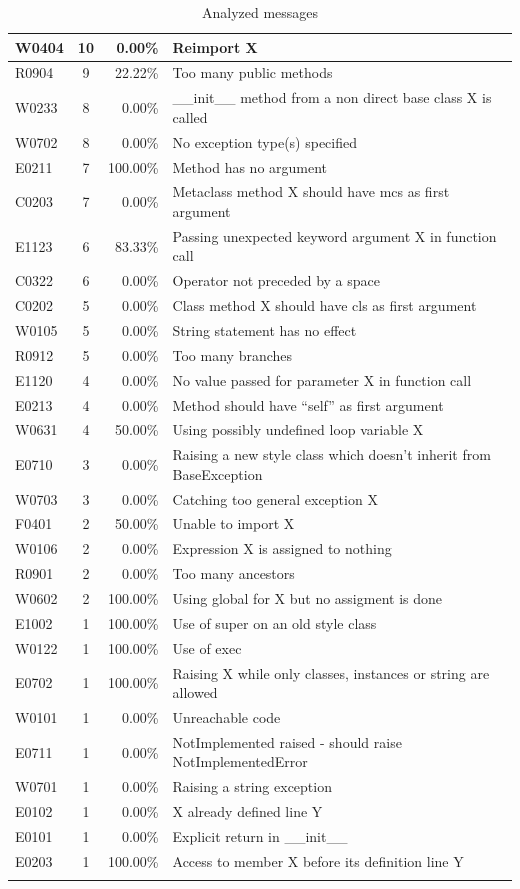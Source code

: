 \documentclass[11pt, a4paper]{article}
\begin{document}
\begin{longtable}{|l|c|r|m{9cm}|}
\hline
W0404 & 10 & 0.00\% & Reimport X \\
\hline
R0904 & 9 & 22.22\% & Too many public methods \\
\hline
W0233 & 8 & 0.00\% & \_\_init\_\_ method from a non direct base class X is called \\
\hline
W0702 & 8 & 0.00\% & No exception type(s) specified \\
\hline
E0211 & 7 & 100.00\% & Method has no argument \\
\hline
C0203 & 7 & 0.00\% & Metaclass method X should have mcs as first argument \\
\hline
E1123 & 6 & 83.33\% & Passing unexpected keyword argument X in function call \\
\hline
C0322 & 6 & 0.00\% & Operator not preceded by a space \\
\hline
C0202 & 5 & 0.00\% & Class method X should have cls as first argument \\
\hline
W0105 & 5 & 0.00\% & String statement has no effect \\
\hline
R0912 & 5 & 0.00\% & Too many branches \\
\hline
E1120 & 4 & 0.00\% & No value passed for parameter X in function call \\
\hline
E0213 & 4 & 0.00\% & Method should have \enquote{self} as first argument \\
\hline
W0631 & 4 & 50.00\% & Using possibly undefined loop variable X \\
\hline
E0710 & 3 & 0.00\% & Raising a new style class which doesn't inherit from BaseException \\
\hline
W0703 & 3 & 0.00\% & Catching too general exception X \\
\hline
F0401 & 2 & 50.00\% & Unable to import X \\
\hline
W0106 & 2 & 0.00\% & Expression X is assigned to nothing \\
\hline
R0901 & 2 & 0.00\% & Too many ancestors \\
\hline
W0602 & 2 & 100.00\% & Using global for X but no assigment is done \\
\hline
E1002 & 1 & 100.00\% & Use of super on an old style class \\
\hline
W0122 & 1 & 100.00\% & Use of exec \\
\hline
E0702 & 1 & 100.00\% & Raising X while only classes, instances or string are allowed \\
\hline
W0101 & 1 & 0.00\% & Unreachable code \\
\hline
E0711 & 1 & 0.00\% & NotImplemented raised - should raise NotImplementedError \\
\hline
W0701 & 1 & 0.00\% & Raising a string exception \\
\hline
E0102 & 1 & 0.00\% & X already defined line Y \\
\hline
E0101 & 1 & 0.00\% & Explicit return in \_\_init\_\_ \\
\hline
E0203 & 1 & 100.00\% & Access to member X before its definition line Y \\
\hline
\caption{\label{messages} Analyzed messages}
\end{longtable}
\end{document}
